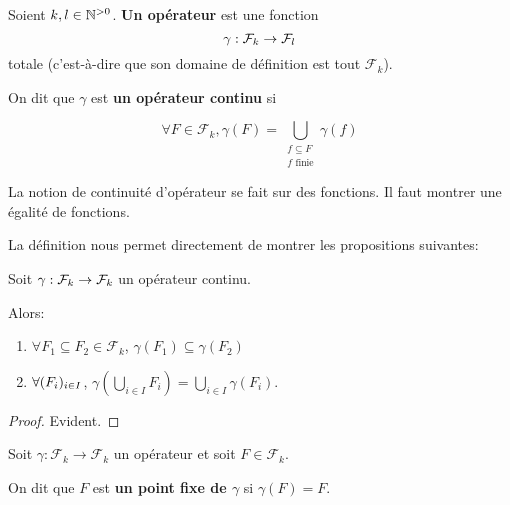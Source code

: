 \begin{definition} [Opérateur]
	Soient $k, l \in \mathbb{N}^{> 0}$.
	\textbf{Un opérateur} est une fonction
	\begin{equation}
		\gamma : \mathcal{F}_{k} \rightarrow \mathcal{F}_{l}
	\end{equation}
totale (c'est-à-dire que son domaine de définition est tout
	$\mathcal{F}_{k}$).

	On dit que $\gamma$ est \textbf{un opérateur continu} si

	\begin{equation*}
		\forall F \in \mathcal{F}_{k}, \gamma(F) = \displaystyle \bigcup_{\substack{f \subseteq
			F \\ f \text{ finie}}} \gamma(f)
	\end{equation*}
\end{definition}

\begin{remarque}
	La notion de continuité d'opérateur se fait sur des fonctions. Il faut
	montrer une égalité de fonctions.
\end{remarque}

La définition nous permet directement de montrer les propositions suivantes:

\begin{proposition}
	Soit $\gamma : \mathcal{F}_{k} \rightarrow \mathcal{F}_{k}$ un opérateur
	continu.

	Alors:

	\begin{enumerate}
		\item $\forall F_{1} \subseteq F_{2} \in {\mathcal{F}_{k}}$,
			$\gamma(F_{1}) \subseteq \gamma(F_{2})$
		\item $\forall (F_{i})_{i \in I}$, $\displaystyle \gamma(\bigcup_{i \in I} F_{i}) =
			\bigcup_{i \in I} \gamma(F_{i})$.
	\end{enumerate}
\end{proposition}

\ifdefined\outputproof
\begin{proof}
	Evident.
\end{proof}
\fi

\begin{definition} 
	Soit $\gamma : \mathcal{F}_{k} \rightarrow \mathcal{F}_{k}$ un opérateur et
	soit $F \in \mathcal{F}_{k}$.

	On dit que $F$ est \textbf{un point fixe de $\gamma$} si $\gamma(F) = F$.
\end{definition}

